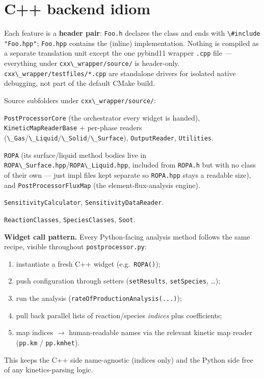 \documentclass[11pt,a4paper]{report}
\newcommand{\pkg}[1]{\lstinline|#1|}
\begin{document}
\chapter{C++ backend idiom}

Each feature is a \textbf{header pair}: \pkg{Foo.h} declares the class and
ends with \pkg{\#include "Foo.hpp"}; \pkg{Foo.hpp} contains the (inline)
implementation. Nothing is compiled as a separate translation unit except
the one pybind11 wrapper \pkg{.cpp} file --- everything under
\pkg{cxx\_wrapper/source/} is header-only. \pkg{cxx\_wrapper/testfiles/*.cpp}
are standalone drivers for isolated native debugging, not part of the
default CMake build.

Source subfolders under \pkg{cxx\_wrapper/source/}:
\begin{description}[leftmargin=2.2cm]
\item[\texttt{core/}] \pkg{PostProcessorCore} (the orchestrator every widget
  is handed), \pkg{KineticMapReaderBase} + per-phase readers
  (\pkg{\_Gas}/\pkg{\_Liquid}/\pkg{\_Solid}/\pkg{\_Surface}), \pkg{OutputReader},
  \pkg{Utilities}.
\item[\texttt{ropa/}] \pkg{ROPA} (its surface/liquid method bodies live in
  \pkg{ROPA\_Surface.hpp}/\pkg{ROPA\_Liquid.hpp}, included from \pkg{ROPA.h}
  but with no class of their own --- just impl files kept separate so
  \pkg{ROPA.hpp} stays a readable size), and \pkg{PostProcessorFluxMap} (the
  element-flux-analysis engine).
\item[\texttt{sensitivity/}] \pkg{SensitivityCalculator},
  \pkg{SensitivityDataReader}.
\item[\texttt{classes/}] \pkg{ReactionClasses}, \pkg{SpeciesClasses},
  \pkg{Soot}.
\end{description}

\textbf{Widget call pattern.} Every Python-facing analysis method follows
the same recipe, visible throughout \pkg{postprocessor.py}:
\begin{enumerate}
\item instantiate a fresh C++ widget (e.g.\ \pkg{ROPA()});
\item push configuration through setters (\pkg{setResults}, \pkg{setSpecies},
  \dots);
\item run the analysis (\pkg{rateOfProductionAnalysis(...)});
\item pull back parallel lists of reaction/species \emph{indices} plus
  coefficients;
\item map indices $\to$ human-readable names via the relevant kinetic map
  reader (\pkg{pp.km} / \pkg{pp.kmhet}).
\end{enumerate}
This keeps the C++ side name-agnostic (indices only) and the Python side
free of any kinetics-parsing logic.
\end{document}
